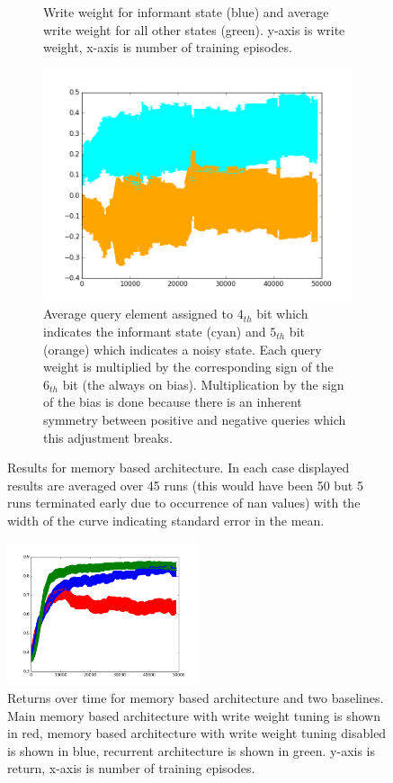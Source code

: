\documentclass{article}
\begin{document}
\begin{figure}[!ht]
\begin{subfigure}[t]{.45\textwidth}
  \caption{Write weight for informant state (blue) and average write weight for all other states (green). y-axis is write weight, x-axis is number of training episodes.}
  \label{fig:1_query_write}
\end{subfigure}\vfill
\begin{subfigure}[t]{.45\textwidth}
\centering
      \includegraphics[width=1\textwidth]{images/queries.png}
  \caption{Average query element assigned to $4_{th}$ bit which indicates the informant state (cyan) and $5_{th}$ bit (orange) which indicates a noisy state. Each query weight is multiplied by the corresponding sign of the $6_{th}$ bit (the always on bias). Multiplication by the sign of the bias is done because there is an inherent symmetry between positive and negative queries which this adjustment breaks.}
\label{fig:1_query_queries}
\end{subfigure}
\caption{Results for memory based architecture. In each case displayed results are averaged over 45 runs (this would have been 50 but 5 runs terminated early due to occurrence of nan values) with the width of the curve indicating standard error in the mean.}
\label{fig:1_query}
\end{figure}

\begin{figure}[!ht]
\center
\includegraphics[width=0.5\textwidth]{images/combined_ret.png}
\caption{Returns over time for memory based architecture and two baselines. Main memory based architecture with write weight tuning is shown in red, memory based architecture with write weight tuning disabled is shown in blue, recurrent architecture is shown in green. y-axis is return, x-axis is number of training episodes.}
\label{fig:comparison}
\end{figure}
\end{document}
